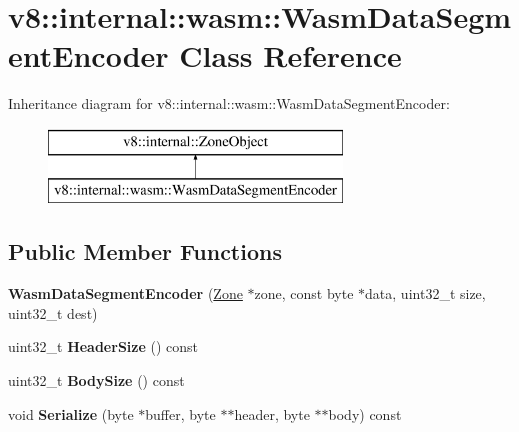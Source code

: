 \hypertarget{classv8_1_1internal_1_1wasm_1_1_wasm_data_segment_encoder}{}\section{v8\+:\+:internal\+:\+:wasm\+:\+:Wasm\+Data\+Segment\+Encoder Class Reference}
\label{classv8_1_1internal_1_1wasm_1_1_wasm_data_segment_encoder}
Inheritance diagram for v8\+:\+:internal\+:\+:wasm\+:\+:Wasm\+Data\+Segment\+Encoder\+:\begin{figure}[H]
\begin{center}
\leavevmode
\includegraphics[height=2.000000cm]{classv8_1_1internal_1_1wasm_1_1_wasm_data_segment_encoder}
\end{center}
\end{figure}
\subsection*{Public Member Functions}
\begin{DoxyCompactItemize}
\item 
{\bfseries Wasm\+Data\+Segment\+Encoder} (\hyperlink{classv8_1_1internal_1_1_zone}{Zone} $\ast$zone, const byte $\ast$data, uint32\+\_\+t size, uint32\+\_\+t dest)\hypertarget{classv8_1_1internal_1_1wasm_1_1_wasm_data_segment_encoder_a89ebf7f7d337c0455e50c9ccda89515e}{}\label{classv8_1_1internal_1_1wasm_1_1_wasm_data_segment_encoder_a89ebf7f7d337c0455e50c9ccda89515e}

\item 
uint32\+\_\+t {\bfseries Header\+Size} () const \hypertarget{classv8_1_1internal_1_1wasm_1_1_wasm_data_segment_encoder_adada5b210fba9eb9cdd3bbff0dc8d2b0}{}\label{classv8_1_1internal_1_1wasm_1_1_wasm_data_segment_encoder_adada5b210fba9eb9cdd3bbff0dc8d2b0}

\item 
uint32\+\_\+t {\bfseries Body\+Size} () const \hypertarget{classv8_1_1internal_1_1wasm_1_1_wasm_data_segment_encoder_a399830cae979b3a8e71ebde7e914e927}{}\label{classv8_1_1internal_1_1wasm_1_1_wasm_data_segment_encoder_a399830cae979b3a8e71ebde7e914e927}

\item 
void {\bfseries Serialize} (byte $\ast$buffer, byte $\ast$$\ast$header, byte $\ast$$\ast$body) const \hypertarget{classv8_1_1internal_1_1wasm_1_1_wasm_data_segment_encoder_a6803957ee81b391fe8648c7a62e2b23f}{}\label{classv8_1_1internal_1_1wasm_1_1_wasm_data_segment_encoder_a6803957ee81b391fe8648c7a62e2b23f}

\end{DoxyCompactItemize}
